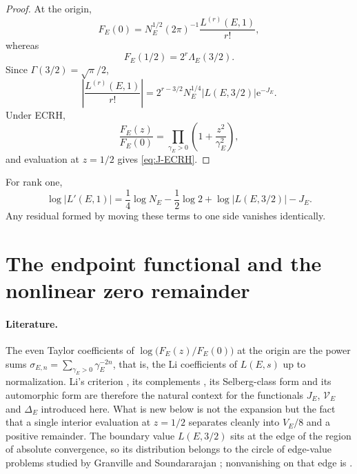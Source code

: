 \documentclass[11pt,reqno]{amsart}
\theoremstyle{remark}
\newcommand{\e}{\mathrm{e}}
\begin{document}
\begin{proof}
At the origin,
\begin{equation}
  F_E(0)=N_E^{1/2}(2\pi)^{-1}
  \frac{L^{(r)}(E,1)}{r!},
\end{equation}
whereas
\begin{equation}
  F_E(1/2)=2^r\Lambda_E(3/2).
\end{equation}
Since $\Gamma(3/2)=\sqrt\pi/2$,
\begin{equation}
  \left|\frac{L^{(r)}(E,1)}{r!}\right|
  =2^{r-3/2}N_E^{1/4}|L(E,3/2)|\e^{-J_E}.
  \label{eq:multiplicative-identity}
\end{equation}
Under ECRH,
\begin{equation}
  \frac{F_E(z)}{F_E(0)}
  =\prod_{\gamma_E>0}
   \left(1+\frac{z^2}{\gamma_E^2}\right),
\end{equation}
and evaluation at $z=1/2$ gives \eqref{eq:J-ECRH}.
\end{proof}

For rank one,
\begin{equation}
  \log|L'(E,1)|
  =\frac14\log N_E-\frac12\log2
   +\log|L(E,3/2)|-J_E.
  \label{eq:rank-one}
\end{equation}
Any residual formed by moving these terms to one side vanishes identically.

\section{The endpoint functional and the nonlinear zero remainder}
\label{sec:endpoint}

\paragraph{Literature.}
The even Taylor coefficients of $\log\bigl(F_E(z)/F_E(0)\bigr)$ at the origin are the power sums $\sigma_{E,n}=\sum_{\gamma_E>0}\gamma_E^{-2n}$, that is, the Li coefficients of $L(E,s)$ up to normalization.  Li's criterion \cite{Li1997}, its complements \cite{BombieriLagarias1999}, its Selberg-class form \cite{OmarMazhouda2007} and its automorphic form \cite{Lagarias2007} are therefore the natural context for the functionals $J_E$, $\mathscr V_E$ and $\Delta_E$ introduced here.  What is new below is not the expansion but the fact that a single interior evaluation at $z=1/2$ separates cleanly into $V_E/8$ and a positive remainder.  The boundary value $L(E,3/2)$ sits at the edge of the region of absolute convergence, so its distribution belongs to the circle of edge-value problems studied by Granville and Soundararajan \cite{GranvilleSoundararajan2003}; nonvanishing on that edge is \cite{JacquetShalika1976}.
\end{document}
